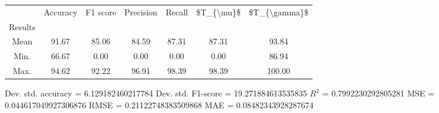 \begin{tabular}{|c|c|c|c|c|c|c|}
\toprule
{} &  Accuracy &  F1 score &  Precision &  Recall &  \$T\_\{\textbackslash mu\}\$ &  \$T\_\{\textbackslash gamma\}\$ \\
Results &           &           &            &         &            &               \\
\hline
Mean    &     91.67 &     85.06 &      84.59 &   87.31 &      87.31 &         93.84 \\
Min.    &     66.67 &      0.00 &       0.00 &    0.00 &       0.00 &         86.94 \\
Max.    &     94.62 &     92.22 &      96.91 &   98.39 &      98.39 &        100.00 \\
\bottomrule
\end{tabular}

 Dev. std. accuracy = 6.129182460217784
 Dev. std. F1-score = 19.271884613535835
 $R^2$ = 0.7992230292805281
 MSE = 0.044617049927306876
 RMSE = 0.21122748383509868
 MAE = 0.08482343928287674